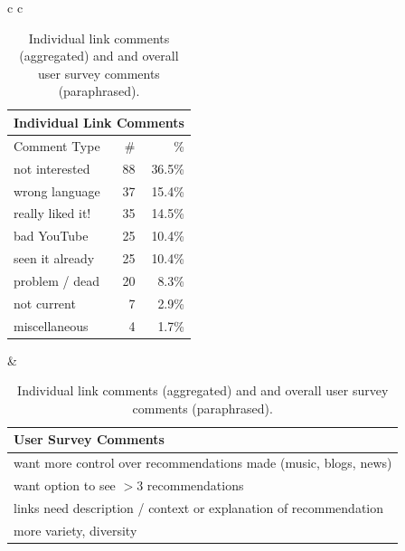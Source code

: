 \begin{table}[t!]
\centering
\footnotesize
\begin{tabular}{c c}
\hspace{-3mm} 
\begin{tabular}{|l|r|r|} 
\multicolumn{3}{c}{Individual Link Comments} \\ \hline
Comment Type & \# & \% \\ \hline %
not interested & 88 & 36.5\% \\
wrong language & 37 & 15.4\% \\
really liked it! & 35 & 14.5\% \\
bad YouTube & 25 & 10.4\% \\
seen it	already & 25 & 10.4\% \\
problem / dead & 20 & 8.3\% \\
not current & 7 & 2.9\% \\	
miscellaneous & 4 & 1.7\% \\
\hline
\end{tabular}
&
\hspace{-3mm} \begin{tabular}{|p{3.34cm}|}
\multicolumn{1}{p{3.34cm}}{User Survey Comments}\\ \hline
want more control over recommendations made (music, blogs, news)\\ \hline
want option to see $> 3$ recommendations \\ \hline
links need description / context or explanation of recommendation \\ \hline 
more variety, diversity\\ \hline
\end{tabular}
\end{tabular}
\caption{Individual link comments (aggregated) and 
and overall user survey comments (paraphrased).}
\label{table:survey}
\end{table}
